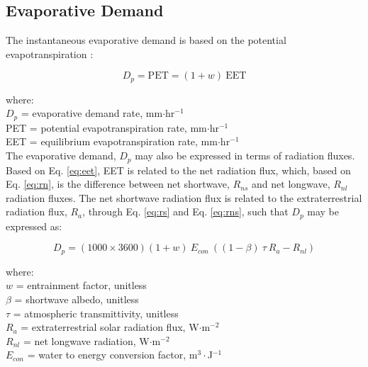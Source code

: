 \subsection{Evaporative Demand}
\label{sec:dp}
The instantaneous evaporative demand is based on the potential evapotranspiration \parencite{federer82}:

\begin{equation}
\label{eq:dp}
	D_p = \text{PET} = \left(1+w\right)\:\text{EET}
\end{equation}

\noindent where: \\
\indent $D_p$ = evaporative demand rate, mm$\cdot$hr$^{-1}$\\
\indent PET = potential evapotranspiration rate, mm$\cdot$hr$^{-1}$\\
\indent EET = equilibrium evapotranspiration rate, mm$\cdot$hr$^{-1}$\\

\noindent The evaporative demand, $D_p$ may also be expressed in terms of radiation fluxes. 
Based on Eq. \ref{eq:eet}, EET is related to the net radiation flux, which, based on Eq. \ref{eq:rn}, is the difference between net shortwave, $R_{ns}$ and net longwave, $R_{nl}$ radiation fluxes. 
The net shortwave radiation flux is related to the extraterrestrial radiation flux, $R_a$, through Eq. \ref{eq:rs} and Eq. \ref{eq:rns}, such that $D_p$ may be expressed as:

\begin{equation}
\label{eq:dpa}
	D_p = \left(1000\times 3600\right) \left(1+w\right)\: E_{con}\:\left(
		\left(1-\beta\right)\:\tau\: R_a - R_{nl} \right)
\end{equation}

\noindent where:\\
\indent $w$ = entrainment factor, unitless \\
\indent $\beta$ = shortwave albedo, unitless \\
\indent $\tau$ = atmospheric transmittivity, unitless \\
\indent $R_{a}$ = extraterrestrial solar radiation flux, W$\cdot$m$^{-2}$ \\
\indent $R_{nl}$ = net longwave radiation, W$\cdot$m$^{-2}$ \\
\indent $E_{con}$ = water to energy conversion factor, m$^{3}\cdot$J$^{-1}$\\

